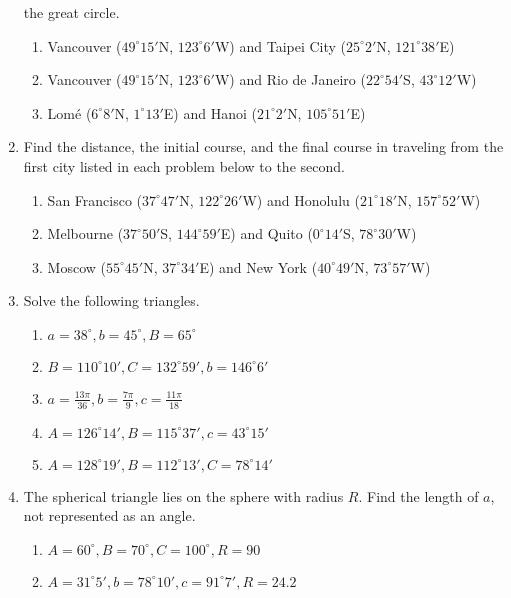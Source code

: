 \documentclass[11pt]{article}
\begin{document}
\begin{enumerate}
  the great circle.
  \begin{enumerate}
  \item Vancouver ($49^{\circ}15'$N, $123^{\circ}6'$W) and Taipei City
    ($25^{\circ}2'$N, $121^{\circ}38'$E)
  \item Vancouver ($49^{\circ}15'$N, $123^{\circ}6'$W) and Rio de
    Janeiro ($22^{\circ}54'$S, $43^{\circ}12'$W)
  \item Lom{\'e} ($6^{\circ}8'$N, $1^{\circ}13'$E) and Hanoi
    ($21^{\circ}2'$N, $105^{\circ}51'$E)
  \end{enumerate}
\item Find the distance, the initial course, and the final course in
  traveling from the first city listed in each problem below to the
  second.
  \begin{enumerate}
  \item San Francisco ($37^{\circ}47'$N, $122^{\circ}26'$W) and
    Honolulu ($21^{\circ}18'$N, $157^{\circ}52'$W)
  \item Melbourne ($37^{\circ}50'$S, $144^{\circ}59'$E) and Quito
    ($0^{\circ}14'$S, $78^{\circ}30'$W)
  \item Moscow ($55^{\circ}45'$N, $37^{\circ}34'$E) and New York
    ($40^{\circ}49'$N, $73^{\circ}57'$W)
  \end{enumerate}
\item Solve the following triangles.
  \begin{enumerate}
  \item $a=38^{\circ},b=45^{\circ},B=65^{\circ}$
  \item $B=110^{\circ}10',C=132^{\circ}59',b=146^{\circ}6'$
  \item $a=\frac{13\pi}{36},b=\frac{7\pi}{9},c=\frac{11\pi}{18}$
  \item $A=126^{\circ}14',B=115^{\circ}37',c=43^{\circ}15'$
  \item $A=128^{\circ}19',B=112^{\circ}13',C=78^{\circ}14'$
  \end{enumerate}
\item The spherical triangle lies on the sphere with radius $R$. Find
  the length of $a$, not represented as an angle.
  \begin{enumerate}
  \item $A=60^{\circ},B=70^{\circ},C=100^{\circ},R=90$
  \item $A=31^{\circ}5',b=78^{\circ}10',c=91^{\circ}7',R=24.2$
  \end{enumerate}
\end{enumerate}
\end{document}
